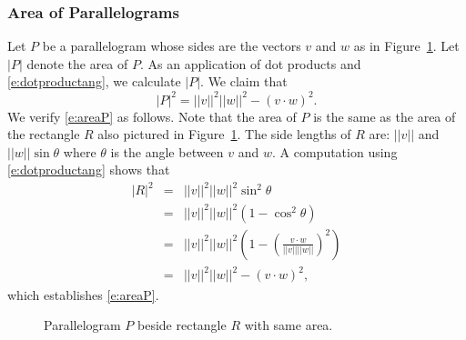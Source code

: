 \documentclass{ximera}
\begin{document}
\subsubsection{Area of Parallelograms}

Let $P$ be a parallelogram whose sides are the vectors $v$ and $w$ as
in Figure~\ref{F:parallel}.  Let $|P|$ denote the area of $P$.  As an
application of dot products  and
\eqref{e:dotproductang}, we calculate $|P|$. 
We claim that
\begin{equation}  \label{e:areaP}
|P|^2 = ||v||^2||w||^2 - (v\cdot w)^2.
\end{equation}
We verify \eqref{e:areaP} as follows.  Note that the area of $P$
is the same as the area of the rectangle $R$ also pictured in
Figure~\ref{F:parallel}.  The side lengths of $R$ are: $||v||$ and
$||w||\sin\theta$ where $\theta$ is the angle between $v$ and $w$.
A computation using \eqref{e:dotproductang} shows that
\begin{eqnarray*}
|R|^2 & = & ||v||^2 ||w||^2\sin^2\theta \\
& = & ||v||^2 ||w||^2(1-\cos^2\theta) \\
& = & ||v||^2 ||w||^2\left(1-\left(\frac{v\cdot w}{||v|| ||w||}
\right)^2\right)\\
& = & ||v||^2 ||w||^2 - (v\cdot w)^2,
\end{eqnarray*}
which establishes \eqref{e:areaP}.

\begin{figure}[htb]
     \centerline{%
     }
     \caption{Parallelogram $P$ beside rectangle $R$ with same area.}
     \label{F:parallel}
\end{figure}


\EXER

\TEXER
\end{document}
